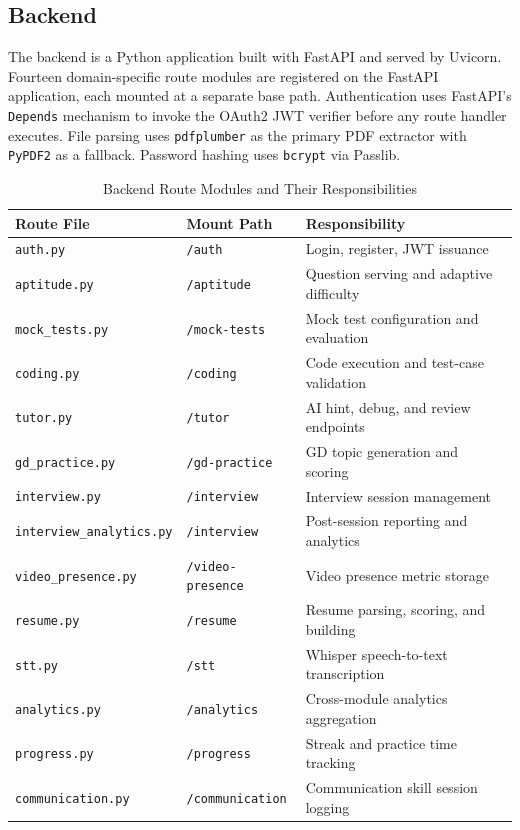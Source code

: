 \documentclass[12pt,a4paper]{report}
\begin{document}
\subsection{Backend}

The backend is a Python application built with FastAPI and served by Uvicorn. Fourteen domain-specific route modules are registered on the FastAPI application, each mounted at a separate base path. Authentication uses FastAPI's \texttt{Depends} mechanism to invoke the OAuth2 JWT verifier before any route handler executes. File parsing uses \texttt{pdfplumber} as the primary PDF extractor with \texttt{PyPDF2} as a fallback. Password hashing uses \texttt{bcrypt} via Passlib.

\begin{table}[H]
    \centering
    \caption{Backend Route Modules and Their Responsibilities}
    \label{tab:routes}
    \begin{tabular}{|l|l|p{5.5cm}|}
        \hline
        \textbf{Route File} & \textbf{Mount Path} & \textbf{Responsibility} \\
        \hline
        \texttt{auth.py} & \texttt{/auth} & Login, register, JWT issuance \\
        \texttt{aptitude.py} & \texttt{/aptitude} & Question serving and adaptive difficulty \\
        \texttt{mock\_tests.py} & \texttt{/mock-tests} & Mock test configuration and evaluation \\
        \texttt{coding.py} & \texttt{/coding} & Code execution and test-case validation \\
        \texttt{tutor.py} & \texttt{/tutor} & AI hint, debug, and review endpoints \\
        \texttt{gd\_practice.py} & \texttt{/gd-practice} & GD topic generation and scoring \\
        \texttt{interview.py} & \texttt{/interview} & Interview session management \\
        \texttt{interview\_analytics.py} & \texttt{/interview} & Post-session reporting and analytics \\
        \texttt{video\_presence.py} & \texttt{/video-presence} & Video presence metric storage \\
        \texttt{resume.py} & \texttt{/resume} & Resume parsing, scoring, and building \\
        \texttt{stt.py} & \texttt{/stt} & Whisper speech-to-text transcription \\
        \texttt{analytics.py} & \texttt{/analytics} & Cross-module analytics aggregation \\
        \texttt{progress.py} & \texttt{/progress} & Streak and practice time tracking \\
        \texttt{communication.py} & \texttt{/communication} & Communication skill session logging \\
        \hline
    \end{tabular}
\end{table}
\end{document}
